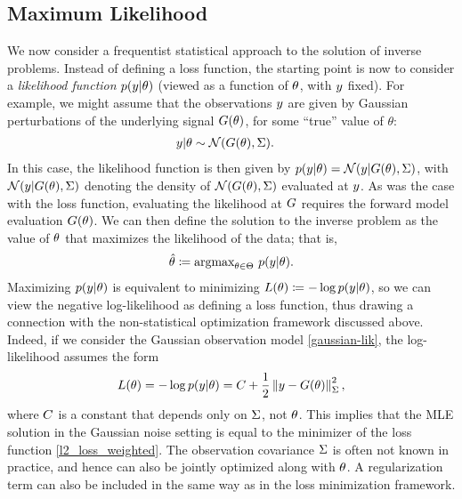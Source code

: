 \documentclass[12pt]{article}
\begin{document}
\subsection{Maximum Likelihood}
We now consider a frequentist statistical approach to the solution of inverse problems. Instead of defining a loss function, the 
starting point is now to consider a \textit{likelihood function} $p(y | \theta)$ (viewed as a function of $\theta$, with $y$ fixed). 
For example, we might assume that the observations $y$ are given by Gaussian perturbations of the underlying signal 
$G(\theta)$, for some ``true'' value of $\theta$: 
\begin{align}
y | \theta &\sim \mathcal{N}(G(\theta), \Sigma). \label{gaussian-lik}
\end{align}
In this case, the likelihood function is then given by $p(y | \theta) = \mathcal{N}(y | G(\theta), \Sigma)$, with 
$\mathcal{N}(y | G(\theta), \Sigma)$ denoting the density of $\mathcal{N}(G(\theta), \Sigma)$ evaluated 
at $y$. As was the case with the loss function, evaluating the likelihood at $G$ requires the forward 
model evaluation $G(\theta)$. We can then define the solution to the inverse problem as the value 
of $\theta$ that maximizes the likelihood of the data; that is, 
\begin{align}
\hat{\theta} \coloneqq \text{argmax}_{\theta \in \Theta} \ p(y | \theta). \label{mle}
\end{align}
Maximizing $p(y | \theta)$ is equivalent to minimizing $L(\theta) \coloneqq -\log p(y | \theta)$, so we can view the 
negative log-likelihood as defining a loss function, thus drawing a connection with the non-statistical optimization 
framework discussed above. Indeed, if we consider the Gaussian observation model \ref{gaussian-lik}, the log-likelihood
assumes the form 
\begin{align}
L(\theta) = -\log p(y | \theta) = C + \frac{1}{2} \left\lVert y - G(\theta)\right\rVert_{\Sigma}^2, 
\end{align}
where $C$ is a constant that depends only on $\Sigma$, not $\theta$. 
This implies that the MLE solution in the Gaussian noise setting is equal to the minimizer of the loss function 
\ref{l2_loss_weighted}. The observation covariance $\Sigma$ is often not known in practice, and hence can 
also be jointly optimized along with $\theta$. A regularization term can also be included in the same way as in the 
loss minimization framework. 
\end{document}

